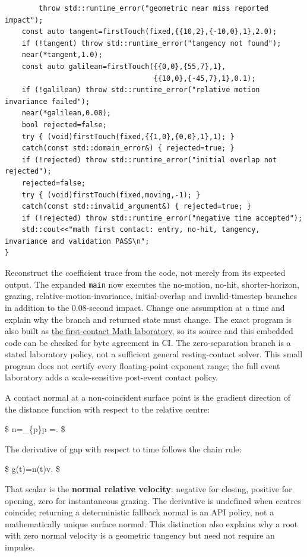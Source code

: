 \begin{verbatim}
        throw std::runtime_error("geometric near miss reported impact");
    const auto tangent=firstTouch(fixed,{{10,2},{-10,0},1},2.0);
    if (!tangent) throw std::runtime_error("tangency not found");
    near(*tangent,1.0);
    const auto galilean=firstTouch({{0,0},{55,7},1},
                                   {{10,0},{-45,7},1},0.1);
    if (!galilean) throw std::runtime_error("relative motion invariance failed");
    near(*galilean,0.08);
    bool rejected=false;
    try { (void)firstTouch(fixed,{{1,0},{0,0},1},1); }
    catch(const std::domain_error&) { rejected=true; }
    if (!rejected) throw std::runtime_error("initial overlap not rejected");
    rejected=false;
    try { (void)firstTouch(fixed,moving,-1); }
    catch(const std::invalid_argument&) { rejected=true; }
    if (!rejected) throw std::runtime_error("negative time accepted");
    std::cout<<"math first contact: entry, no-hit, tangency, invariance and validation PASS\n";
}
\end{verbatim}

Reconstruct the coefficient trace from the code, not merely from its expected output. The expanded \texttt{main} now executes the no-motion, no-hit, shorter-horizon, grazing, relative-motion-invariance, initial-overlap and invalid-timestep branches in addition to the 0.08-second impact. Change one assumption at a time and explain why the branch and returned state must change. The exact program is also built as \href{../../tools/labs/math_contact_toi_lab.cpp}{the first-contact Math laboratory}, so its source and this embedded code can be checked for byte agreement in CI. The zero-separation branch is a stated laboratory policy, not a sufficient general resting-contact solver. This small program does not certify every floating-point exponent range; the full event laboratory adds a scale-sensitive post-event contact policy.

A contact normal at a non-coincident surface point is the gradient direction of the distance function with respect to the relative centre:

\$ \mathbf n=\nabla\_\{\mathbf p\}\textbar{}\mathbf p\textbar{} =. \$

The derivative of gap with respect to time follows the chain rule:

\$ \dot g(t)=\mathbf n(t)\cdot\mathbf v. \$

That scalar is the \textbf{normal relative velocity}: negative for closing, positive for opening, zero for instantaneous grazing. The derivative is undefined when centres coincide; returning a deterministic fallback normal is an API policy, not a mathematically unique surface normal. This distinction also explains why a root with zero normal velocity is a geometric tangency but need not require an impulse.

